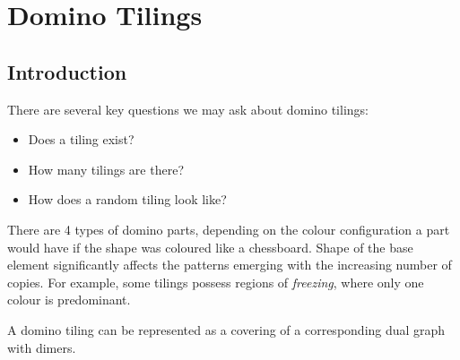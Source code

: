 \documentclass[11pt]{scrartcl}
\begin{document}
  \section{Domino Tilings}

  \subsection{Introduction}

  There are several key questions we may ask about domino tilings:
  \begin{itemize}
  \item Does a tiling exist?
  \item How many tilings are there?
  \item How does a random tiling look like?
  \end{itemize}

  There are 4 types of domino parts, depending on the colour
  configuration a part would have if the shape was coloured like a
  chessboard. Shape of the base element significantly affects the
  patterns emerging with the increasing number of copies. For example,
  some tilings possess regions of \textit{freezing}, where only one
  colour is predominant.

  A domino tiling can be represented as a covering of a corresponding
  dual graph with dimers.
\end{document}
